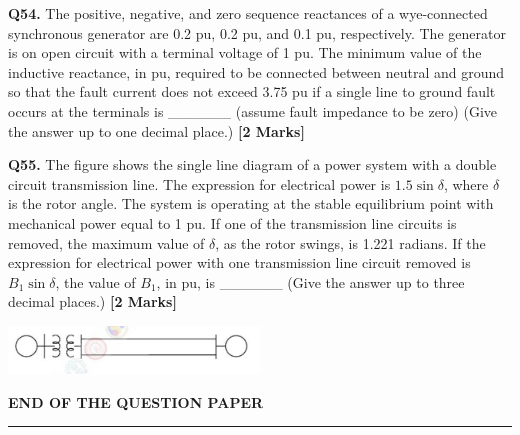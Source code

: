 \documentclass[11pt]{article}
\newcommand{\questionb}[2]{
    \noindent\textbf{Q#2.} #1 \hfill \textbf{[2 Marks]}
}
\begin{document}
\questionb{The positive, negative, and zero sequence reactances of a wye-connected synchronous generator are 0.2 pu, 0.2 pu, and 0.1 pu, respectively. The generator is on open circuit with a terminal voltage of 1 pu. The minimum value of the inductive reactance, in pu, required to be connected between neutral and ground so that the fault current does not exceed 3.75 pu if a single line to ground fault occurs at the terminals is \_\_\_\_\_\_ (assume fault impedance to be zero) (Give the answer up to one decimal place.)}{54}
\vspace{0.5cm}

\questionb{The figure shows the single line diagram of a power system with a double circuit transmission line. The expression for electrical power is \( 1.5\sin\delta \), where \( \delta \) is the rotor angle. The system is operating at the stable equilibrium point with mechanical power equal to 1 pu. If one of the transmission line circuits is removed, the maximum value of \( \delta \), as the rotor swings, is 1.221 radians. If the expression for electrical power with one transmission line circuit removed is \( B_1 \sin\delta \), the value of \( B_1 \), in pu, is \_\_\_\_\_\_ (Give the answer up to three decimal places.)}{55}
\begin{center}
\includegraphics[width=0.5\textwidth]{figures/55.png}
\end{center}
\vspace{0.5cm}


\vspace{5cm}
\begin{center}
\textbf{END OF THE QUESTION PAPER} \\
\rule{\textwidth}{0.5pt}
\end{center}
\end{document}
